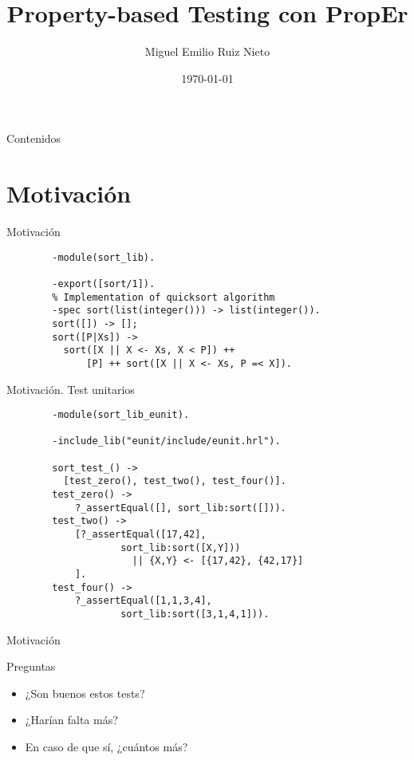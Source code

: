 \documentclass{beamer}
\title[ACFI]{Property-based Testing con PropEr}
\author{Miguel Emilio Ruiz Nieto}
\date{\today} %
\begin{document}
  \begin{frame}
    \titlepage
  \end{frame}

  \begin{frame}{Contenidos}
    \tableofcontents[hideallsubsections]
  \end{frame}

  \section{Motivación}
    \begin{frame}[fragile]{Motivación}
      \begin{verbatim}
        -module(sort_lib).

        -export([sort/1]).
        % Implementation of quicksort algorithm
        -spec sort(list(integer())) -> list(integer()).
        sort([]) -> [];
        sort([P|Xs]) ->
          sort([X || X <- Xs, X < P]) ++
              [P] ++ sort([X || X <- Xs, P =< X]).
      \end{verbatim}
    \end{frame}
    \begin{frame}[fragile]{Motivación. Test unitarios}
      \begin{verbatim}
        -module(sort_lib_eunit).

        -include_lib("eunit/include/eunit.hrl").

        sort_test_() ->
          [test_zero(), test_two(), test_four()].
        test_zero() ->
            ?_assertEqual([], sort_lib:sort([])).
        test_two() ->
            [?_assertEqual([17,42],
                    sort_lib:sort([X,Y]))
                      || {X,Y} <- [{17,42}, {42,17}]
            ].
        test_four() ->
            ?_assertEqual([1,1,3,4],
                    sort_lib:sort([3,1,4,1])).
      \end{verbatim}
    \end{frame}
    \begin{frame}{Motivación}
      \begin{block}{Preguntas}
        \begin{itemize}
          \item ¿Son buenos estos tests?
          \item ¿Harían falta más?
          \item En caso de que sí, ¿cuántos más?
        \end{itemize}
      \end{block}
    \end{frame}
\end{document}
